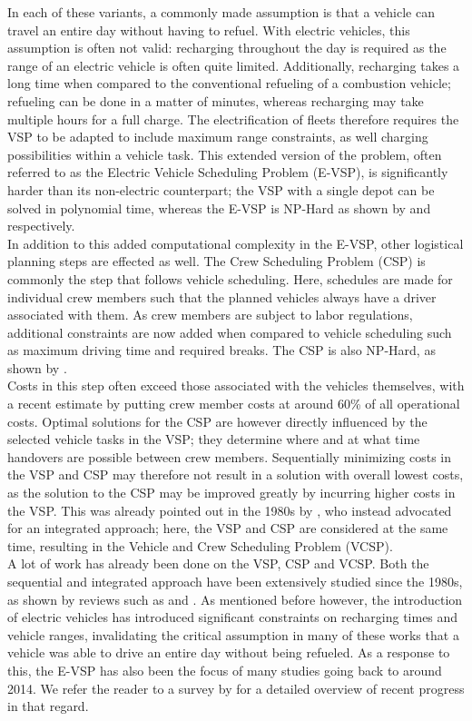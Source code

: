 \documentclass[]{article}
\begin{document}
In each of these variants, a commonly made assumption is that a vehicle can travel an entire day without having to refuel. With electric vehicles, this assumption is often not valid: recharging throughout the day is required as the range of an electric vehicle is often quite limited. Additionally, recharging takes a long time when compared to the conventional refueling of a combustion vehicle; refueling can be done in a matter of minutes, whereas recharging may take multiple hours for a full charge. The electrification of fleets therefore requires the VSP to be adapted to include maximum range constraints, as well charging possibilities within a vehicle task. This extended version of the problem, often referred to as the Electric Vehicle Scheduling Problem (E-VSP), is significantly harder than its non-electric counterpart; the VSP with a single depot can be solved in polynomial time, whereas the E-VSP is NP-Hard as shown by \citet{Bunte2009} and \citet{Sassi2014} respectively. \\
In addition to this added computational complexity in the E-VSP, other logistical planning steps are effected as well. The Crew Scheduling Problem (CSP) is commonly the step that follows vehicle scheduling. Here, schedules are made for individual crew members such that the planned vehicles always have a driver associated with them. As crew members are subject to labor regulations, additional constraints are now added when compared to vehicle scheduling such as maximum driving time and required breaks. The CSP is also NP-Hard, as shown by \citet{Fischetti1989}.\\
Costs in this step often exceed those associated with the vehicles themselves, with a recent estimate by \citet{Perumal2019Crew} putting crew member costs at around 60\% of all operational costs. Optimal solutions for the CSP are however directly influenced by the selected vehicle tasks in the VSP; they determine where and at what time handovers are possible between crew members. Sequentially minimizing costs in the VSP and CSP may therefore not result in a solution with overall lowest costs, as the solution to the CSP may be improved greatly by incurring higher costs in the VSP. This was already pointed out in the 1980s by \citet{Bodin1983}, who instead advocated for an integrated approach; here, the VSP and CSP are considered at the same time, resulting in the Vehicle and Crew Scheduling Problem (VCSP). \\
A lot of work has already been done on the VSP, CSP and VCSP. Both the sequential and integrated approach have been extensively studied since the 1980s, as shown by reviews such as \citet{Ibarra-Rojas2015} and \citet{Ge2024}. As mentioned before however, the introduction of electric vehicles has introduced significant constraints on recharging times and vehicle ranges, invalidating the critical assumption in many of these works that a vehicle was able to drive an entire day without being refueled. As a response to this, the E-VSP has also been the focus of many studies going back to around 2014. We refer the reader to a survey by \citet{Perumal2022LitRev} for a detailed overview of recent progress in that regard. \\
\end{document}
